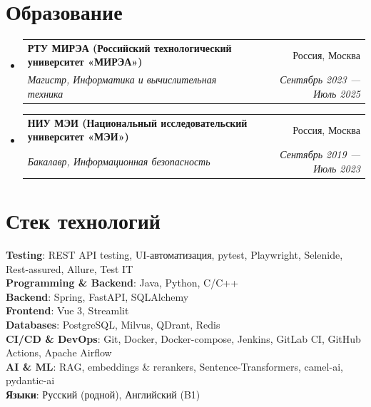 \documentclass[letterpaper,11pt]{article}
\makeatletter
\newcommand{\resumeSubheading}[4]{
  \vspace{-2pt}\item
    \begin{tabular*}{0.97\textwidth}[t]{l@{\extracolsep{\fill}}r}
      \textbf{#1} & #2 \\
      \textit{\small#3} & \textit{\small #4} \\
    \end{tabular*}\vspace{-7pt}
}
\newcommand{\resumeSubHeadingListStart}{\begin{itemize}[leftmargin=0.15in, label={}]}
\newcommand{\resumeSubHeadingListEnd}{\end{itemize}}
\makeatother
\begin{document}
\section{Образование}
  \resumeSubHeadingListStart
    \resumeSubheading
      {РТУ МИРЭА (Российский технологический университет «МИРЭА»)}{Россия, Москва}
      {Магистр, Информатика и вычислительная техника}{Сентябрь 2023 --- Июль 2025}
    \resumeSubheading
      {НИУ МЭИ (Национальный исследовательский университет «МЭИ»)}{Россия, Москва}
      {Бакалавр, Информационная безопасность}{Сентябрь 2019 --- Июль 2023}
  \resumeSubHeadingListEnd


\section{Стек технологий}
 \begin{itemize}[leftmargin=0.15in, label={}]
    \small{\item{
     \textbf{Testing}{: REST API testing, UI-автоматизация, pytest, Playwright, Selenide, Rest-assured, Allure, Test IT} \\
     \textbf{Programming \& Backend}{: Java, Python, C/C++} \\
     \textbf{Backend}{: Spring, FastAPI, SQLAlchemy} \\
     \textbf{Frontend}{: Vue 3, Streamlit} \\
     \textbf{Databases}{: PostgreSQL, Milvus, QDrant, Redis} \\
     \textbf{CI/CD \& DevOps}{: Git, Docker, Docker-compose, Jenkins, GitLab CI, GitHub Actions, Apache Airflow} \\
     \textbf{AI \& ML}{: RAG, embeddings \& rerankers, Sentence-Transformers, camel-ai, pydantic-ai} \\
     \textbf{Языки}{: Русский (родной), Английский (B1)}
    }}
 \end{itemize}


\end{document}
